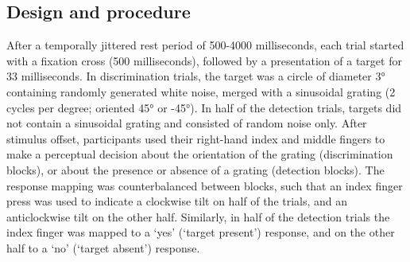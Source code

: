 \documentclass[12pt,twoside]{reedthesis}
\begin{document}
\hypertarget{design-and-procedure}{%
\subsection{Design and procedure}\label{design-and-procedure}}

After a temporally jittered rest period of 500-4000 milliseconds, each trial started with a fixation cross (500 milliseconds), followed by a presentation of a target for 33 milliseconds. In discrimination trials, the target was a circle of diameter 3° containing randomly generated white noise, merged with a sinusoidal grating (2 cycles per degree; oriented 45° or -45°). In half of the detection trials, targets did not contain a sinusoidal grating and consisted of random noise only. After stimulus offset, participants used their right-hand index and middle fingers to make a perceptual decision about the orientation of the grating (discrimination blocks), or about the presence or absence of a grating (detection blocks). The response mapping was counterbalanced between blocks, such that an index finger press was used to indicate a clockwise tilt on half of the trials, and an anticlockwise tilt on the other half. Similarly, in half of the detection trials the index finger was mapped to a `yes' (`target present') response, and on the other half to a `no' (`target absent') response.
\end{document}
